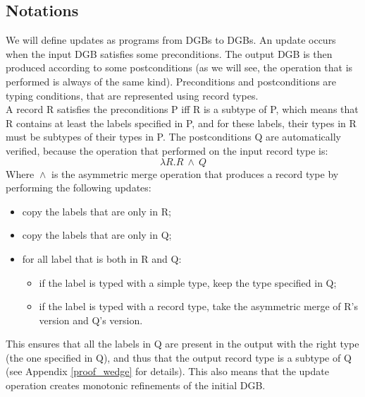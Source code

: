 \documentclass[11pt]{article}
\begin{document}
		\subsection{Notations}
			We will define updates as programs from DGBs to DGBs. An update occurs when the input DGB satisfies some preconditions. The output DGB is then produced according to some postconditions (as we will see, the operation that is performed is always of the same kind). Preconditions and postconditions are typing conditions, that are represented using record types.\\
			
			A record R satisfies the preconditions P iff R is a subtype of P, which means that R contains at least the labels specified in P, and for these labels, their types in R must be subtypes of their types in P. The postconditions Q are automatically verified, because the operation that performed on the input record type is:
			\begin{equation*}
				\lambda R. R \ \boxed{\wedge} \ Q
			\end{equation*}
			Where $\boxed{\wedge}$ is the asymmetric merge operation that produces a record type by performing the following updates:
			\begin{itemize}
				\item copy the labels that are only in R;\vspace{-2mm}
				\item copy the labels that are only in Q; \vspace{-2mm}
				\item for all label that is both in R and Q: \vspace{-2mm}
				\begin{itemize}
					\item if the label is typed with a simple type, keep the type specified in Q;\vspace{-1mm}
					\item if the label is typed with a record type, take the asymmetric merge of R's version and Q's version.
				\end{itemize}
			\end{itemize}
			This ensures that all the labels in Q are present in the output with the right type (the one specified in Q), and thus that the output record type is a subtype of Q (see Appendix \ref{proof_wedge} for details). This also means that the update operation creates monotonic refinements of the initial DGB.
\end{document}
